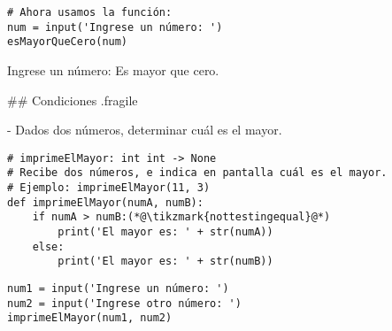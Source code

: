 \pause

\vspace{-3ex}

\pause


\bgncolumns
{}
\vspace{-1ex}


\begin{lstlisting}
# Ahora usamos la función: 
num = input('Ingrese un número: ')
esMayorQueCero(num)
\end{lstlisting}

\vspace{-1ex}


\begin{exampleConsole}
Ingrese un número: 
Es mayor que cero.
\end{exampleConsole}

\trmcolumns

## Condiciones {.fragile}


\vspace{-3ex}

- Dados dos números, determinar cuál es el mayor.

\vspace{-1ex}
\begin{lstlisting}
# imprimeElMayor: int int -> None
# Recibe dos números, e indica en pantalla cuál es el mayor.
# Ejemplo: imprimeElMayor(11, 3)
def imprimeElMayor(numA, numB):
    if numA > numB:(*@\tikzmark{nottestingequal}@*)
        print('El mayor es: ' + str(numA))
    else:
        print('El mayor es: ' + str(numB))
\end{lstlisting}

\vspace{-2ex}

\bgncolumns
{}


\begin{lstlisting}
num1 = input('Ingrese un número: ')
num2 = input('Ingrese otro número: ')
imprimeElMayor(num1, num2)
\end{lstlisting}

